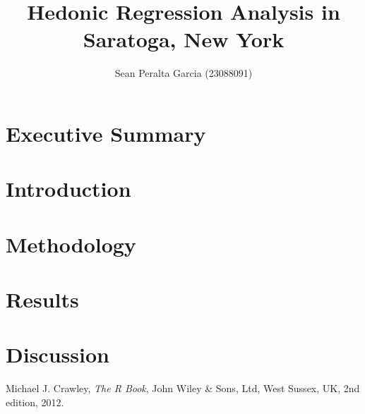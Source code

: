 \documentclass[10pt,A4,makeidx]{article}
\title
{Hedonic Regression Analysis in Saratoga, New York}
\author{Sean Peralta Garcia (23088091)}
\date {}
\begin{document}
\maketitle


\section{Executive Summary}
\section{Introduction}
\section{Methodology}
\section{Results}
\section{Discussion}


\begin{thebibliography}{9}
Michael J. Crawley,
  \textit{The R Book},
  John Wiley \& Sons, Ltd, West Sussex, UK,
  2nd edition,
  2012.
\end{thebibliography}
\end{document}
